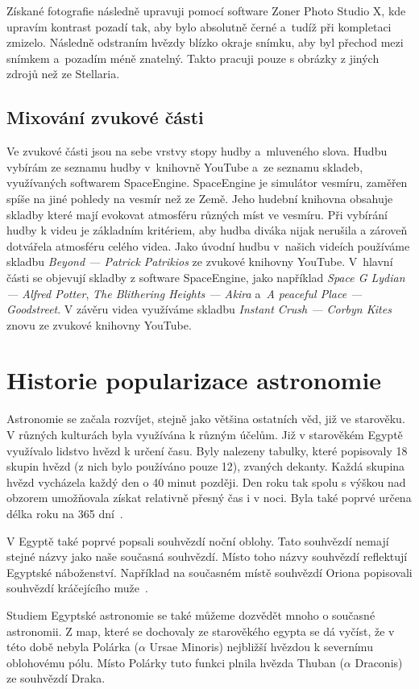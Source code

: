 \documentclass[12pt,a4paper,titlepage]{article}
\begin{document}
Získané fotografie následně upravuji pomocí software Zoner Photo Studio X, kde upravím kontrast pozadí tak, aby bylo absolutně černé a~tudíž při kompletaci zmizelo. Následně odstraním hvězdy blízko okraje snímku, aby byl přechod mezi snímkem a~pozadím méně znatelný. Takto pracuji pouze s obrázky z jiných zdrojů než ze Stellaria.
\subsection{Mixování zvukové části}
Ve zvukové části jsou na sebe vrstvy stopy hudby a~mluveného slova. Hudbu vybírám ze seznamu hudby v~knihovně YouTube a~ze seznamu skladeb, využívaných softwarem SpaceEngine. SpaceEngine je simulátor vesmíru, zaměřen spíše na jiné pohledy na vesmír než ze Země. Jeho hudební knihovna obsahuje skladby které mají evokovat atmosféru různých míst ve vesmíru. Při vybírání hudby k videu je základním kritériem, aby hudba diváka nijak nerušila a zároveň dotvářela atmosféru celého videa. Jako úvodní hudbu v~našich videích používáme skladbu \textit{Beyond --- Patrick Patrikios} ze zvukové knihovny YouTube. V~hlavní části se objevují skladby z software SpaceEngine, jako například \textit{Space G Lydian --- Alfred Potter}, \textit{The Blithering Heights --- Akira} a~\textit{A peaceful Place --- Goodstreet}. V závěru videa využíváme skladbu \textit{Instant Crush --- Corbyn Kites} znovu ze zvukové knihovny YouTube.
\section{Historie popularizace astronomie}
Astronomie se začala rozvíjet, stejně jako většina ostatních věd, již ve starověku. V různých kulturách byla využívána k různým účelům. Již v starověkém Egyptě využívalo lidstvo hvězd k určení času. Byly nalezeny tabulky, které popisovaly 18 skupin hvězd (z nich bylo používáno pouze 12), zvaných dekanty. Každá skupina hvězd vycházela každý den o 40 minut později. Den roku tak spolu s výškou nad obzorem umožňovala získat relativně přesný čas i v noci. Byla také poprvé určena délka roku na 365 dní~. 

V Egyptě také poprvé popsali souhvězdí noční oblohy. Tato souhvězdí nemají stejné názvy jako naše současná souhvězdí. Místo toho názvy souhvězdí reflektují Egyptské náboženství. Například na současném místě souhvězdí Oriona popisovali souhvězdí kráčejícího muže~.

Studiem Egyptské astronomie se také můžeme dozvědět mnoho o současné astronomii. Z map, které se dochovaly ze starověkého egypta se dá vyčíst, že v této době nebyla Polárka ($\alpha$ Ursae Minoris) nejbližší hvězdou k severnímu oblohovému pólu. Místo Polárky tuto funkci plnila hvězda Thuban ($\alpha$ Draconis) ze souhvězdí Draka. 
\end{document}
